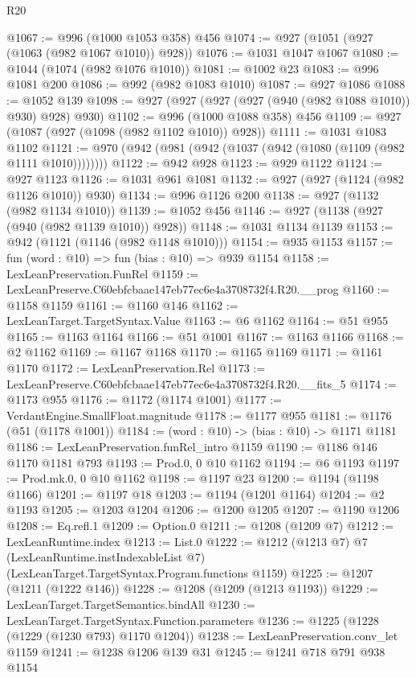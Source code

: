 \begin{lexlean}{R20}
\begin{coremodule}
@1067 := @996 (@1000 @1053 @358) @456
@1074 := @927 (@1051 (@927 (@1063 (@982 @1067 @1010)) @928))
@1076 := @1031 @1047 @1067
@1080 := @1044 (@1074 (@982 @1076 @1010))
@1081 := @1002 @23
@1083 := @996 @1081 @200
@1086 := @992 (@982 @1083 @1010)
@1087 := @927 @1086
@1088 := @1052 @139
@1098 := @927 (@927 (@927 (@927 (@940 (@982 @1088 @1010)) @930) @928) @930)
@1102 := @996 (@1000 @1088 @358) @456
@1109 := @927 (@1087 (@927 (@1098 (@982 @1102 @1010)) @928))
@1111 := @1031 @1083 @1102
@1121 := @970 (@942 (@981 (@942 (@1037 (@942 (@1080 (@1109 (@982 @1111 @1010))))))))
@1122 := @942 @928
@1123 := @929 @1122
@1124 := @927 @1123
@1126 := @1031 @961 @1081
@1132 := @927 (@927 (@1124 (@982 @1126 @1010)) @930)
@1134 := @996 @1126 @200
@1138 := @927 (@1132 (@982 @1134 @1010))
@1139 := @1052 @456
@1146 := @927 (@1138 (@927 (@940 (@982 @1139 @1010)) @928))
@1148 := @1031 @1134 @1139
@1153 := @942 (@1121 (@1146 (@982 @1148 @1010)))
@1154 := @935 @1153
@1157 := fun (word : @10) => fun (bias : @10) => @939 @1154
@1158 := LexLeanPreservation.FunRel
@1159 := LexLeanPreserve.C60ebfcbaae147eb77ec6e4a3708732f4.R20.__prog
@1160 := @1158 @1159
@1161 := @1160 @146
@1162 := LexLeanTarget.TargetSyntax.Value
@1163 := @6 @1162
@1164 := @51 @955
@1165 := @1163 @1164
@1166 := @51 @1001
@1167 := @1163 @1166
@1168 := @2 @1162
@1169 := @1167 @1168
@1170 := @1165 @1169
@1171 := @1161 @1170
@1172 := LexLeanPreservation.Rel
@1173 := LexLeanPreserve.C60ebfcbaae147eb77ec6e4a3708732f4.R20.__fits_5
@1174 := @1173 @955
@1176 := @1172 (@1174 @1001)
@1177 := VerdantEngine.SmallFloat.magnitude
@1178 := @1177 @955
@1181 := @1176 (@51 (@1178 @1001))
@1184 := (word : @10) -> (bias : @10) -> @1171 @1181
@1186 := LexLeanPreservation.funRel_intro @1159
@1190 := @1186 @146 @1170 @1181 @793
@1193 := Prod.{0, 0} @10 @1162
@1194 := @6 @1193
@1197 := Prod.mk.{0, 0} @10 @1162
@1198 := @1197 @23
@1200 := @1194 (@1198 @1166)
@1201 := @1197 @18
@1203 := @1194 (@1201 @1164)
@1204 := @2 @1193
@1205 := @1203 @1204
@1206 := @1200 @1205
@1207 := @1190 @1206
@1208 := Eq.refl.{1}
@1209 := Option.{0}
@1211 := @1208 (@1209 @7)
@1212 := LexLeanRuntime.index
@1213 := List.{0}
@1222 := @1212
    (@1213 @7)
    @7
    (LexLeanRuntime.instIndexableList @7)
    (LexLeanTarget.TargetSyntax.Program.functions @1159)
@1225 := @1207 (@1211 (@1222 @146))
@1228 := @1208 (@1209 (@1213 @1193))
@1229 := LexLeanTarget.TargetSemantics.bindAll
@1230 := LexLeanTarget.TargetSyntax.Function.parameters
@1236 := @1225 (@1228 (@1229 (@1230 @793) @1170 @1204))
@1238 := LexLeanPreservation.conv_let @1159
@1241 := @1238 @1206 @139 @31
@1245 := @1241 @718 @791 @938 @1154

\end{coremodule}
\end{lexlean}
